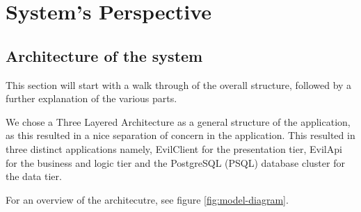 \documentclass[report/main.tex]{subfiles}
\begin{document}
    \section{System's Perspective}
    \label{Sec:systems_perspective}
    
    \subsection{Architecture of the system}
    \label{subsec:architecture_of_system}
        
        
        This section will start with a walk through of the overall structure, followed by a further explanation of the various parts.
        
        We chose a Three Layered Architecture as a general structure of the application, as this resulted in a nice separation of concern in the application. This resulted in three distinct applications namely, EvilClient for the presentation tier, EvilApi for the business and logic tier and the PostgreSQL (PSQL) database cluster for the data tier.
        
        For an overview of the architecutre, see figure \ref{fig:model-diagram}.
        
\end{document}
